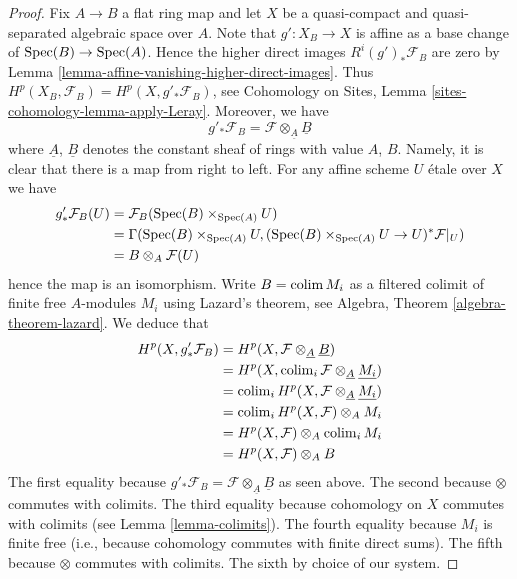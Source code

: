 \begin{proof}
\medskip\noindent
Fix $A \to B$ a flat ring map and let $X$ be a quasi-compact and
quasi-separated algebraic space over $A$. Note that $g' : X_B \to X$
is affine as a base change of $\mathop{\mathrm{Spec}}(B) \to \mathop{\mathrm{Spec}}(A)$. Hence
the higher direct images $R^i(g')_*\mathcal{F}_B$ are zero by
Lemma \ref{lemma-affine-vanishing-higher-direct-images}.
Thus $H^p(X_B, \mathcal{F}_B) = H^p(X, g'_*\mathcal{F}_B)$, see
Cohomology on Sites, Lemma \ref{sites-cohomology-lemma-apply-Leray}.
Moreover, we have
$$
g'_*\mathcal{F}_B = \mathcal{F} \otimes_{\underline{A}} \underline{B}
$$
where $\underline{A}$, $\underline{B}$ denotes the constant sheaf of
rings with value $A$, $B$. Namely, it is clear that there is a map
from right to left. For any affine scheme $U$ \'etale over $X$ we have
\begin{align*}
g'_*\mathcal{F}_B(U) & = \mathcal{F}_B(\mathop{\mathrm{Spec}}(B) \times_{\mathop{\mathrm{Spec}}(A)} U) \\
& =
\Gamma(\mathop{\mathrm{Spec}}(B) \times_{\mathop{\mathrm{Spec}}(A)} U,
(\mathop{\mathrm{Spec}}(B) \times_{\mathop{\mathrm{Spec}}(A)} U \to U)^*\mathcal{F}|_U) \\
& =
B \otimes_A \mathcal{F}(U)
\end{align*}
hence the map is an isomorphism. Write $B = \mathop{\mathrm{colim}}\nolimits M_i$ as a filtered
colimit of finite free $A$-modules $M_i$ using Lazard's theorem, see
Algebra, Theorem \ref{algebra-theorem-lazard}.
We deduce that
\begin{align*}
H^p(X, g'_*\mathcal{F}_B) &
= H^p(X, \mathcal{F} \otimes_{\underline{A}} \underline{B}) \\
& = H^p(X, \mathop{\mathrm{colim}}\nolimits_i \mathcal{F} \otimes_{\underline{A}} \underline{M_i}) \\
& = \mathop{\mathrm{colim}}\nolimits_i H^p(X, \mathcal{F} \otimes_{\underline{A}} \underline{M_i}) \\
& = \mathop{\mathrm{colim}}\nolimits_i H^p(X, \mathcal{F}) \otimes_A M_i \\
& = H^p(X, \mathcal{F}) \otimes_A \mathop{\mathrm{colim}}\nolimits_i M_i \\
& = H^p(X, \mathcal{F}) \otimes_A B
\end{align*}
The first equality because
$g'_*\mathcal{F}_B = \mathcal{F} \otimes_{\underline{A}} \underline{B}$
as seen above.
The second because $\otimes$ commutes with colimits.
The third equality because cohomology on $X$ commutes with
colimits (see
Lemma \ref{lemma-colimits}).
The fourth equality because $M_i$ is finite free (i.e., because cohomology
commutes with finite direct sums).
The fifth because $\otimes$ commutes with colimits.
The sixth by choice of our system.
\end{proof}

